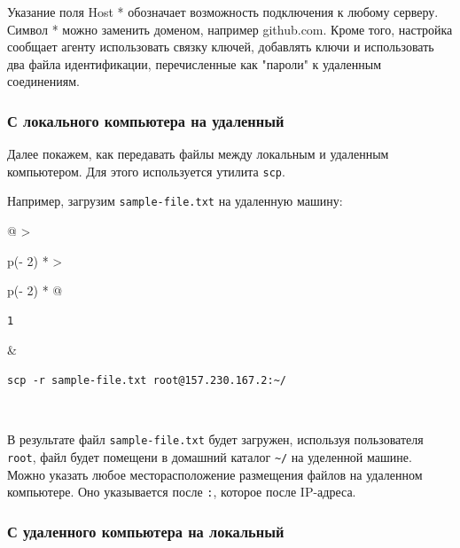 \documentclass{report}
\begin{document}
Указание поля Host * обозначает возможность подключения к любому
серверу. Символ * можно заменить доменом, например github.com. Кроме
того, настройка сообщает агенту использовать связку ключей, добавлять
ключи и использовать два файла идентификации, перечисленные как "пароли"
к удаленным соединениям.

\hypertarget{From-local-computer-to-remote-machine}{%
\subsubsection{\texorpdfstring{\protect\hyperlink{From-local-computer-to-remote-machine}{}С
локального компьютера на
удаленный}{С локального компьютера на удаленный}}\label{From-local-computer-to-remote-machine}}

Далее покажем, как передавать файлы между локальным и удаленным
компьютером. Для этого используется утилита \texttt{scp}.

Например, загрузим \texttt{sample-file.txt} на удаленную машину:

\begin{longtable}[]{@{}
  >{\raggedright\arraybackslash}p{(\columnwidth - 2\tabcolsep) * }
  >{\raggedright\arraybackslash}p{(\columnwidth - 2\tabcolsep) * }@{}}
\toprule
\endhead
\begin{minipage}[t]{\linewidth}\raggedright
\begin{verbatim}
1
\end{verbatim}
\end{minipage} & \begin{minipage}[t]{\linewidth}\raggedright
\begin{verbatim}
scp -r sample-file.txt root@157.230.167.2:~/
\end{verbatim}
\end{minipage} \\ \addlinespace
\bottomrule
\end{longtable}

В результате файл \texttt{sample-file.txt} будет загружен, используя
пользователя \texttt{root}, файл будет помещени в домашний каталог
\texttt{\textasciitilde{}/} на уделенной машине. Можно указать любое
месторасположение размещения файлов на удаленном компьютере. Оно
указывается после \texttt{:}, которое после IP-адреса.

\hypertarget{From-remote-machine-to-local-computer}{%
\subsubsection{\texorpdfstring{\protect\hyperlink{From-remote-machine-to-local-computer}{}С
удаленного компьютера на
локальный}{С удаленного компьютера на локальный}}\label{From-remote-machine-to-local-computer}}
\end{document}
